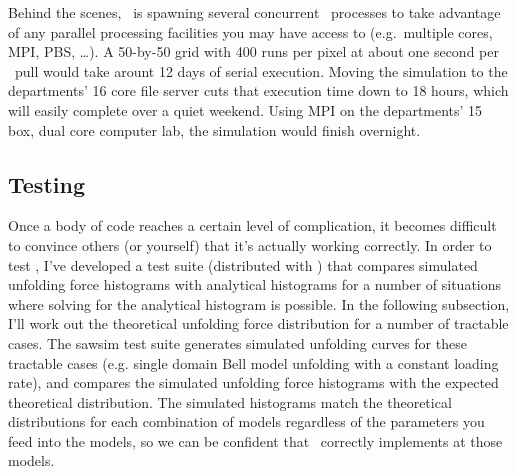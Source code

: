 Behind the scenes, \pysawsim\ is spawning several concurrent
\sawsim\ processes to take advantage of any parallel processing
facilities you may have access to (e.g.~multiple cores, MPI, PBS,
\ldots).  A 50-by-50 grid with 400 runs per pixel at about one second
per \sawsim\ pull would take arount 12 days of serial execution.
Moving the simulation to the departments' 16 core file server cuts
that execution time down to 18 hours, which will easily complete over
a quiet weekend.  Using MPI on the departments' 15 box, dual core
computer lab, the simulation would finish overnight.
%

\subsection{Testing}
\label{sec:sawsim:testing}

Once a body of code reaches a certain level of complication, it
becomes difficult to convince others (or yourself) that it's actually
working correctly.  In order to test \sawsim, I've developed a test
suite (distributed with \sawsim) that compares simulated unfolding
force histograms with analytical histograms for a number of situations
where solving for the analytical histogram is possible.  In the
following subsection, I'll work out the theoretical unfolding force
distribution for a number of tractable cases.  The sawsim test suite
generates simulated unfolding curves for these tractable cases
(e.g. single domain Bell model unfolding with a constant loading
rate), and compares the simulated unfolding force histograms with the
expected theoretical distribution.  The simulated histograms match the
theoretical distributions for each combination of models regardless of
the parameters you feed into the models, so we can be confident that
\sawsim\ correctly implements at those models.

